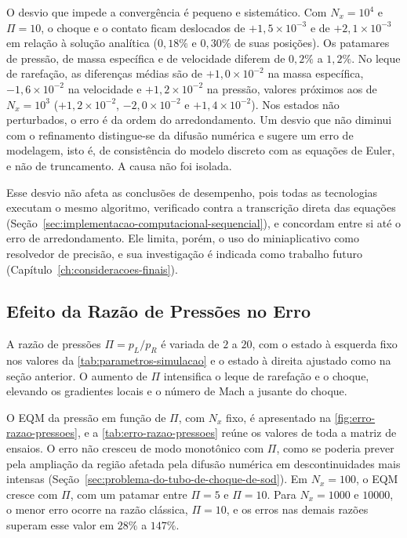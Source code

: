 O desvio que impede a convergência é pequeno e sistemático.
Com \(N_x = 10^4\) e \(\Pi = 10\), o choque e o contato ficam deslocados de \(+1{,}5\times10^{-3}\) e de \(+2{,}1\times10^{-3}\) em relação à solução analítica (\(0{,}18\%\) e \(0{,}30\%\) de suas posições).
Os patamares de pressão, de massa específica e de velocidade diferem de \(0{,}2\%\) a \(1{,}2\%\).
No leque de rarefação, as diferenças médias são de \(+1{,}0\times10^{-2}\) na massa específica, \(-1{,}6\times10^{-2}\) na velocidade e \(+1{,}2\times10^{-2}\) na pressão, valores próximos aos de \(N_x = 10^3\) (\(+1{,}2\times10^{-2}\), \(-2{,}0\times10^{-2}\) e \(+1{,}4\times10^{-2}\)).
Nos estados não perturbados, o erro é da ordem do arredondamento.
Um desvio que não diminui com o refinamento distingue-se da difusão numérica e sugere um erro de modelagem, isto é, de consistência do modelo discreto com as equações de Euler, e não de truncamento.
A causa não foi isolada.

Esse desvio não afeta as conclusões de desempenho, pois todas as tecnologias executam o mesmo algoritmo, verificado contra a transcrição direta das equações (Seção~\ref{sec:implementacao-computacional-sequencial}), e concordam entre si até o erro de arredondamento.
Ele limita, porém, o uso do miniaplicativo como resolvedor de precisão, e sua investigação é indicada como trabalho futuro (Capítulo~\ref{ch:consideracoes-finais}).


\subsection{Efeito da Razão de Pressões no Erro}\label{subsec:efeito-da-razao-de-pressoes-no-erro}

A razão de pressões \(\Pi=p_L/p_R\) é variada de \(2\) a \(20\), com o estado à esquerda fixo nos valores da \autoref{tab:parametros-simulacao} e o estado à direita ajustado como na seção anterior.
O aumento de \(\Pi\) intensifica o leque de rarefação e o choque, elevando os gradientes locais e o número de Mach a jusante do choque.

O EQM da pressão em função de \(\Pi\), com \(N_x\) fixo, é apresentado na \autoref{fig:erro-razao-pressoes}, e a \autoref{tab:erro-razao-pressoes} reúne os valores de toda a matriz de ensaios.
O erro não cresceu de modo monotônico com \(\Pi\), como se poderia prever pela ampliação da região afetada pela difusão numérica em descontinuidades mais intensas (Seção~\ref{sec:problema-do-tubo-de-choque-de-sod}).
Em \(N_x=100\), o EQM cresce com \(\Pi\), com um patamar entre \(\Pi=5\) e \(\Pi=10\).
Para \(N_x=1000\) e \(10000\), o menor erro ocorre na razão clássica, \(\Pi=10\), e os erros nas demais razões superam esse valor em \(28\%\) a \(147\%\).

